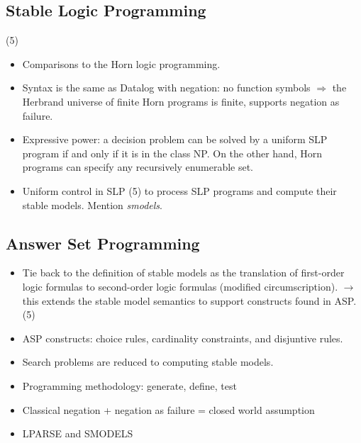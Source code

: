 \subsection{Stable Logic Programming} (5)
\begin{itemize}
    \item Comparisons to the Horn logic programming.
    \item Syntax is the same as Datalog with negation: no function symbols $\Rightarrow$ the Herbrand universe of finite Horn programs 
    is finite, supports negation as failure. 
    \item Expressive power: a decision problem can be solved by a uniform SLP program if and only if 
    it is in the class NP. On the other hand, Horn programs can specify any recursively enumerable set.
    \item Uniform control in SLP (5) to process SLP programs and compute their stable models.
    Mention \textit{smodels}.
\end{itemize}

\subsection{Answer Set Programming}
\begin{itemize}
    \item Tie back to the definition of stable models as the translation of first-order logic 
    formulas to second-order logic formulas (modified circumscription). 
    $\longrightarrow$ this extends the stable model semantics to support constructs found in ASP. (5)
    \item ASP constructs: choice rules, cardinality constraints, and disjuntive rules. 
    \item Search problems are reduced to computing stable models.
    \item Programming methodology: generate, define, test
    \item Classical negation + negation as failure = closed world assumption
    \item LPARSE and SMODELS
\end{itemize}